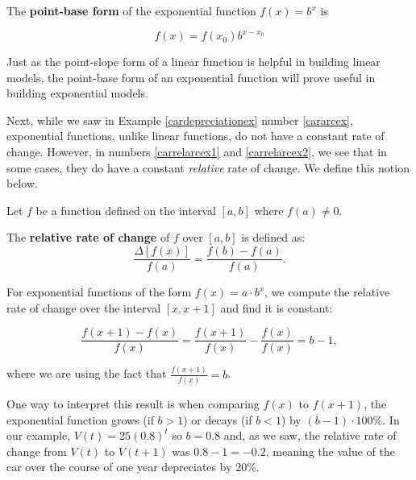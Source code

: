 \documentclass{ximera}
\begin{document}
\smallskip

\colorbox{ResultColor}{\bbm

\begin{defn} \label{expfcnpointbaseform}  The   \textbf{point-base form} of the exponential function $f(x) = b^{x}$  is

\[ f(x) = f(x_{0}) b^{x - x_{0}} \]


\end{defn}

\ebm}

\smallskip

Just as the point-slope form of a linear function is helpful in building linear models, the point-base form of an exponential function will prove useful in building exponential models.

\smallskip

Next, while we saw in Example \ref{cardepreciationex} number \ref{cararcex}, exponential functions, unlike linear functions, do not have a constant rate of change.  However, in numbers \ref{carrelarcex1} and \ref{carrelarcex2}, we see that in some cases, they do have a constant \textit{relative} rate of change.  We define this notion below.

\smallskip


\colorbox{ResultColor}{\bbm

\begin{defn} \label{rrc}  Let $f$ be a function defined on the interval $[a,b]$ where $f(a) \neq 0$.

The \textbf{relative rate of  change}  of $f$ over $[a,b]$ is defined as: \[ \dfrac{\Delta [f(x)] }{f(a)} = \dfrac{f(b) - f(a)}{f(a)} .\]

\end{defn}

\ebm}

\smallskip

For exponential functions of the form $f(x) = a \cdot b^{x}$, we compute the relative rate of change over the interval $[x, x+1]$ and find it is constant:

\[ \dfrac{f(x+1) - f(x)}{f(x)} = \dfrac{f(x+1)}{f(x)} - \dfrac{f(x)}{f(x)} = b -1,\]

where we are using the fact that $\frac{f(x+1)}{f(x)} = b$. 

\smallskip

One way to interpret this result is when comparing $f(x)$ to $f(x+1)$, the exponential function grows (if $b>1$) or decays (if $b<1$) by $(b-1) \cdot 100 \%$.  In our example, $V(t) = 25 (0.8)^{t}$ so $b = 0.8$ and, as we saw, the relative rate of change from $V(t)$ to $V(t+1)$ was $ 0.8 - 1= -0.2$, meaning the value of the car  over the course of one year depreciates by  $20 \%$.
\end{document}
